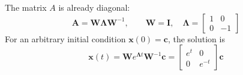 \begin{exampleBox}
    The matrix $A$ is already diagonal:
    \begin{equation}
        \mathbf{A} = \mathbf{W}\mathbf{\Lambda} \mathbf{W}^{-1},\qquad
        \mathbf{W} = \mathbf{I},\quad
        \mathbf{\Lambda} = \begin{bmatrix}1 & 0\\[4pt] 0 & -1\end{bmatrix}
    \end{equation}
    For an arbitrary initial condition $\mathbf{x}(0) = \mathbf{c}$, the solution is
    \begin{equation}
        \mathbf{x}(t) = \mathbf{W} e^{\mathbf{\Lambda} t} \mathbf{W}^{-1} \mathbf{c}
        = \begin{bmatrix}e^{t} & 0\\[4pt] 0 & e^{-t}\end{bmatrix} \mathbf{c}
    \end{equation}


\end{exampleBox}
